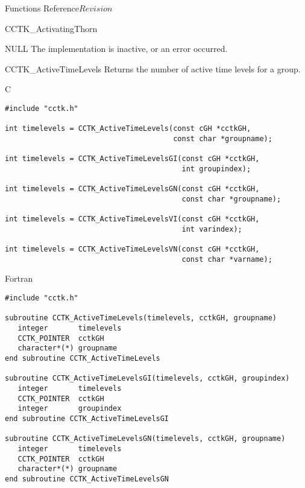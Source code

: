 \begin{cactuspart}{ Functions Reference}{}{$Revision$}
\begin{FunctionDescription}{CCTK\_ActivatingThorn}
\begin{ErrorSection}
\begin{Error}{NULL}
The implementation is inactive, or an error occurred.
\end{Error}
\end{ErrorSection}
\end{FunctionDescription}



\begin{FunctionDescription}{CCTK\_ActiveTimeLevels}
\label{CCTK-ActiveTimeLevels}
Returns the number of active time levels for a group.

\begin{SynopsisSection}
\begin{Synopsis}{C}
\begin{verbatim}
#include "cctk.h"

int timelevels = CCTK_ActiveTimeLevels(const cGH *cctkGH,
                                       const char *groupname);

int timelevels = CCTK_ActiveTimeLevelsGI(const cGH *cctkGH,
                                         int groupindex);

int timelevels = CCTK_ActiveTimeLevelsGN(const cGH *cctkGH,
                                         const char *groupname);

int timelevels = CCTK_ActiveTimeLevelsVI(const cGH *cctkGH,
                                         int varindex);

int timelevels = CCTK_ActiveTimeLevelsVN(const cGH *cctkGH,
                                         const char *varname);
\end{verbatim}
\end{Synopsis}
\begin{Synopsis}{Fortran}
\begin{verbatim}
#include "cctk.h"

subroutine CCTK_ActiveTimeLevels(timelevels, cctkGH, groupname)
   integer       timelevels
   CCTK_POINTER  cctkGH
   character*(*) groupname
end subroutine CCTK_ActiveTimeLevels

subroutine CCTK_ActiveTimeLevelsGI(timelevels, cctkGH, groupindex)
   integer       timelevels
   CCTK_POINTER  cctkGH
   integer       groupindex
end subroutine CCTK_ActiveTimeLevelsGI

subroutine CCTK_ActiveTimeLevelsGN(timelevels, cctkGH, groupname)
   integer       timelevels
   CCTK_POINTER  cctkGH
   character*(*) groupname
end subroutine CCTK_ActiveTimeLevelsGN


\end{verbatim}
\end{Synopsis}
\end{SynopsisSection}
\end{FunctionDescription}
\end{cactuspart}
